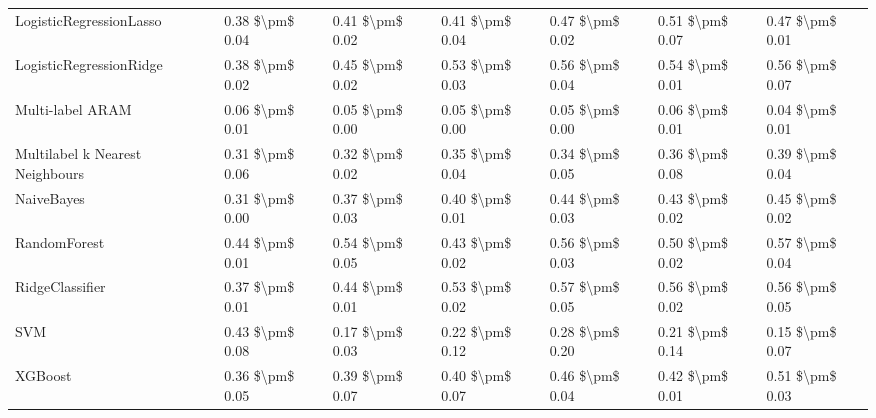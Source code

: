 \begin{tabular}{lllllll}
LogisticRegressionLasso         &  0.38 \$\textbackslash pm\$ 0.04 &           0.41 \$\textbackslash pm\$ 0.02 &       0.41 \$\textbackslash pm\$ 0.04 &        0.47 \$\textbackslash pm\$ 0.02 &                         0.51 \$\textbackslash pm\$ 0.07 &  0.47 \$\textbackslash pm\$ 0.01 \\
LogisticRegressionRidge         &  0.38 \$\textbackslash pm\$ 0.02 &           0.45 \$\textbackslash pm\$ 0.02 &       0.53 \$\textbackslash pm\$ 0.03 &        0.56 \$\textbackslash pm\$ 0.04 &                         0.54 \$\textbackslash pm\$ 0.01 &  0.56 \$\textbackslash pm\$ 0.07 \\
Multi-label ARAM                &  0.06 \$\textbackslash pm\$ 0.01 &           0.05 \$\textbackslash pm\$ 0.00 &       0.05 \$\textbackslash pm\$ 0.00 &        0.05 \$\textbackslash pm\$ 0.00 &                         0.06 \$\textbackslash pm\$ 0.01 &  0.04 \$\textbackslash pm\$ 0.01 \\
Multilabel k Nearest Neighbours &  0.31 \$\textbackslash pm\$ 0.06 &           0.32 \$\textbackslash pm\$ 0.02 &       0.35 \$\textbackslash pm\$ 0.04 &        0.34 \$\textbackslash pm\$ 0.05 &                         0.36 \$\textbackslash pm\$ 0.08 &  0.39 \$\textbackslash pm\$ 0.04 \\
NaiveBayes                      &  0.31 \$\textbackslash pm\$ 0.00 &           0.37 \$\textbackslash pm\$ 0.03 &       0.40 \$\textbackslash pm\$ 0.01 &        0.44 \$\textbackslash pm\$ 0.03 &                         0.43 \$\textbackslash pm\$ 0.02 &  0.45 \$\textbackslash pm\$ 0.02 \\
RandomForest                    &  0.44 \$\textbackslash pm\$ 0.01 &           0.54 \$\textbackslash pm\$ 0.05 &       0.43 \$\textbackslash pm\$ 0.02 &        0.56 \$\textbackslash pm\$ 0.03 &                         0.50 \$\textbackslash pm\$ 0.02 &  0.57 \$\textbackslash pm\$ 0.04 \\
RidgeClassifier                 &  0.37 \$\textbackslash pm\$ 0.01 &           0.44 \$\textbackslash pm\$ 0.01 &       0.53 \$\textbackslash pm\$ 0.02 &        0.57 \$\textbackslash pm\$ 0.05 &                         0.56 \$\textbackslash pm\$ 0.02 &  0.56 \$\textbackslash pm\$ 0.05 \\
SVM                             &  0.43 \$\textbackslash pm\$ 0.08 &           0.17 \$\textbackslash pm\$ 0.03 &       0.22 \$\textbackslash pm\$ 0.12 &        0.28 \$\textbackslash pm\$ 0.20 &                         0.21 \$\textbackslash pm\$ 0.14 &  0.15 \$\textbackslash pm\$ 0.07 \\
XGBoost                         &  0.36 \$\textbackslash pm\$ 0.05 &           0.39 \$\textbackslash pm\$ 0.07 &       0.40 \$\textbackslash pm\$ 0.07 &        0.46 \$\textbackslash pm\$ 0.04 &                         0.42 \$\textbackslash pm\$ 0.01 &  0.51 \$\textbackslash pm\$ 0.03 \\
\bottomrule
\end{tabular}
